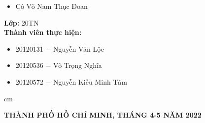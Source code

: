 \begin{titlepage}
\begin{mybox}
\begin{itemize}
\item Cô Võ Nam Thục Đoan
\end{itemize}
\textbf{Lớp:} 20TN\\
\textbf{Thành viên thực hiện:}
\begin{itemize}
\item 20120131 $-$ Nguyễn Văn Lộc
\item 20120536 $-$ Võ Trọng Nghĩa
\item 20120572 $-$ Nguyễn Kiều Minh Tâm
\end{itemize}
 cm
\begin{center}
\textbf{THÀNH PHỐ HỒ CHÍ MINH, THÁNG 4-5 NĂM 2022}
\end{center}
\end{mybox}
\end{titlepage}